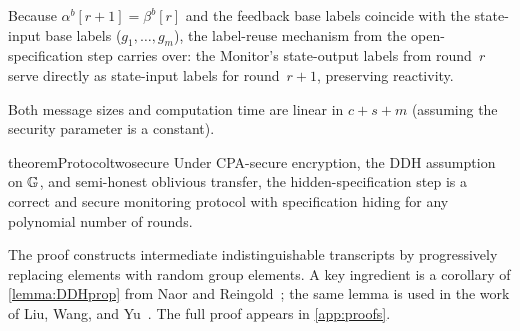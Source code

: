 \noindent Because $\alpha^b[r{+}1] = \beta^b[r]$ and the feedback base labels coincide with the state-input base labels ($g_1,\ldots,g_m$), the label-reuse mechanism from the open-specification step carries over: the Monitor's state-output labels from round~$r$ serve directly as state-input labels for round~$r{+}1$, preserving reactivity.

Both message sizes and computation time are linear in $c{+}s{+}m$ (assuming the security parameter is a constant).

\begin{restatable}{theorem}{Protocoltwosecure}\label{thm:Protocol2secure}
    Under CPA-secure encryption, the DDH assumption on $\mathbb{G}$, and semi-honest oblivious transfer, the hidden-specification step is a correct and secure monitoring protocol with specification hiding for any polynomial number of rounds.
\end{restatable}

The proof constructs intermediate indistinguishable transcripts by progressively replacing elements with random group elements. A key ingredient is a corollary of \cref{lemma:DDHprop} from Naor and Reingold~\cite{NR04}; the same lemma is used in the work of Liu, Wang, and Yu~\cite[Lemma~3]{LWY22}. The full proof appears in \cref{app:proofs}.
